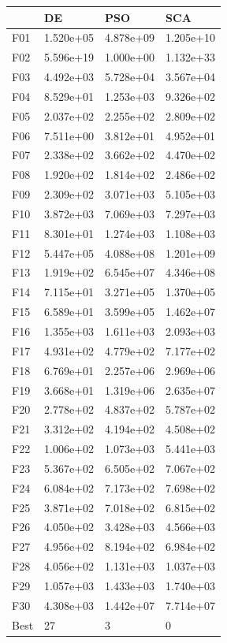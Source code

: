 \begin{tabular}{llll}
\toprule
{} &         DE &        PSO &        SCA \\
\midrule
F01  &  1.520e+05 &  4.878e+09 &  1.205e+10 \\
F02  &  5.596e+19 &  1.000e+00 &  1.132e+33 \\
F03  &  4.492e+03 &  5.728e+04 &  3.567e+04 \\
F04  &  8.529e+01 &  1.253e+03 &  9.326e+02 \\
F05  &  2.037e+02 &  2.255e+02 &  2.809e+02 \\
F06  &  7.511e+00 &  3.812e+01 &  4.952e+01 \\
F07  &  2.338e+02 &  3.662e+02 &  4.470e+02 \\
F08  &  1.920e+02 &  1.814e+02 &  2.486e+02 \\
F09  &  2.309e+02 &  3.071e+03 &  5.105e+03 \\
F10  &  3.872e+03 &  7.069e+03 &  7.297e+03 \\
F11  &  8.301e+01 &  1.274e+03 &  1.108e+03 \\
F12  &  5.447e+05 &  4.088e+08 &  1.201e+09 \\
F13  &  1.919e+02 &  6.545e+07 &  4.346e+08 \\
F14  &  7.115e+01 &  3.271e+05 &  1.370e+05 \\
F15  &  6.589e+01 &  3.599e+05 &  1.462e+07 \\
F16  &  1.355e+03 &  1.611e+03 &  2.093e+03 \\
F17  &  4.931e+02 &  4.779e+02 &  7.177e+02 \\
F18  &  6.769e+01 &  2.257e+06 &  2.969e+06 \\
F19  &  3.668e+01 &  1.319e+06 &  2.635e+07 \\
F20  &  2.778e+02 &  4.837e+02 &  5.787e+02 \\
F21  &  3.312e+02 &  4.194e+02 &  4.508e+02 \\
F22  &  1.006e+02 &  1.073e+03 &  5.441e+03 \\
F23  &  5.367e+02 &  6.505e+02 &  7.067e+02 \\
F24  &  6.084e+02 &  7.173e+02 &  7.698e+02 \\
F25  &  3.871e+02 &  7.018e+02 &  6.815e+02 \\
F26  &  4.050e+02 &  3.428e+03 &  4.566e+03 \\
F27  &  4.956e+02 &  8.194e+02 &  6.984e+02 \\
F28  &  4.056e+02 &  1.131e+03 &  1.037e+03 \\
F29  &  1.057e+03 &  1.433e+03 &  1.740e+03 \\
F30  &  4.308e+03 &  1.442e+07 &  7.714e+07 \\
Best &         27 &          3 &          0 \\
\bottomrule
\end{tabular}
